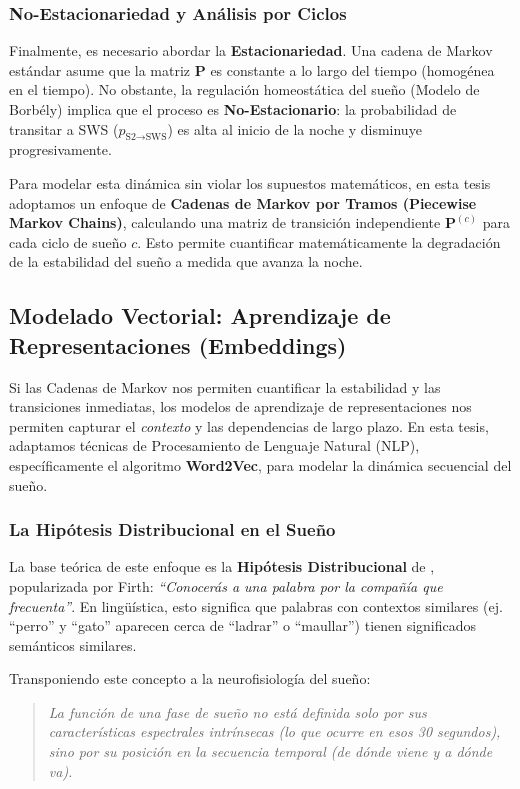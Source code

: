 \subsubsection{No-Estacionariedad y Análisis por Ciclos}

Finalmente, es necesario abordar la \textbf{Estacionariedad}. Una cadena de Markov estándar asume que la matriz $\mathbf{P}$ es constante a lo largo del tiempo (homogénea en el tiempo).
No obstante, la regulación homeostática del sueño (Modelo de Borbély) implica que el proceso es \textbf{No-Estacionario}: la probabilidad de transitar a SWS ($p_{\text{S2} \to \text{SWS}}$) es alta al inicio de la noche y disminuye progresivamente.

Para modelar esta dinámica sin violar los supuestos matemáticos, en esta tesis adoptamos un enfoque de \textbf{Cadenas de Markov por Tramos (Piecewise Markov Chains)}, calculando una matriz de transición independiente $\mathbf{P}^{(c)}$ para cada ciclo de sueño $c$. Esto permite cuantificar matemáticamente la degradación de la estabilidad del sueño a medida que avanza la noche.

\subsection{Modelado Vectorial: Aprendizaje de Representaciones (Embeddings)}

Si las Cadenas de Markov nos permiten cuantificar la estabilidad y las transiciones inmediatas, los modelos de aprendizaje de representaciones nos permiten capturar el \textit{contexto} y las dependencias de largo plazo. En esta tesis, adaptamos técnicas de Procesamiento de Lenguaje Natural (NLP), específicamente el algoritmo \textbf{Word2Vec}, para modelar la dinámica secuencial del sueño.

\subsubsection{La Hipótesis Distribucional en el Sueño}

La base teórica de este enfoque es la \textbf{Hipótesis Distribucional} de \cite{harris1954distributional}, popularizada por Firth: \textit{``Conocerás a una palabra por la compañía que frecuenta''}. En lingüística, esto significa que palabras con contextos similares (ej. ``perro'' y ``gato'' aparecen cerca de ``ladrar'' o ``maullar'') tienen significados semánticos similares.

Transponiendo este concepto a la neurofisiología del sueño:
\begin{quote}
    \textit{La función de una fase de sueño no está definida solo por sus características espectrales intrínsecas (lo que ocurre en esos 30 segundos), sino por su posición en la secuencia temporal (de dónde viene y a dónde va).}
\end{quote}

